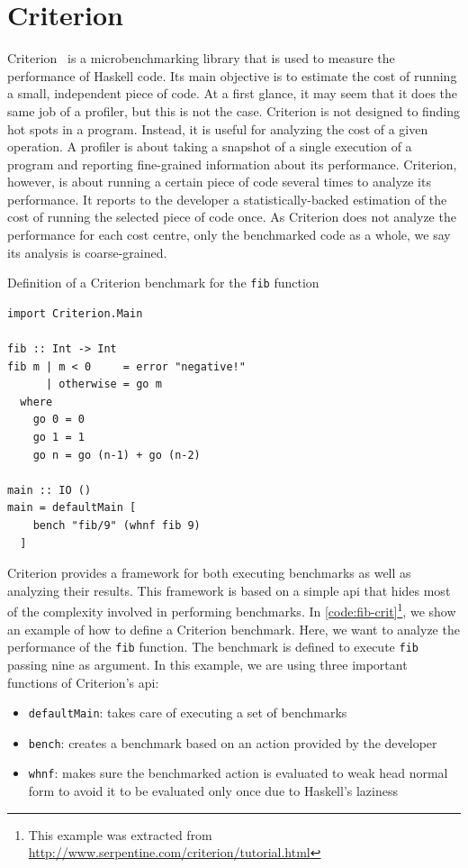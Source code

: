 \section{Criterion}\label{sec:criterion}
Criterion~\cite{sullivan:2009} is a microbenchmarking library that is used to measure the performance of Haskell code. Its main objective is to estimate the cost of running a small, independent piece of code. At a first glance, it may seem that it does the same job of a profiler, but this is not the case. Criterion is not designed to finding hot spots in a program. Instead, it is useful for analyzing the cost of a given operation. A profiler is about taking a snapshot of a single execution of a program and reporting fine-grained information about its performance. Criterion, however, is about running a certain piece of code several times to analyze its performance. It reports to the developer a statistically-backed estimation of the cost of running the selected piece of code once. As Criterion does not analyze the performance for each cost centre, only the benchmarked code as a whole, we say its analysis is coarse-grained.

\begin{listing}
  \caption{Definition of a Criterion benchmark for the \texttt{fib} function}
  \begin{verbatim}
import Criterion.Main

fib :: Int -> Int
fib m | m < 0     = error "negative!"
      | otherwise = go m
  where
    go 0 = 0
    go 1 = 1
    go n = go (n-1) + go (n-2)

main :: IO ()
main = defaultMain [
    bench "fib/9" (whnf fib 9)
  ]
  \end{verbatim}
  \label{code:fib-crit}
\end{listing}

Criterion provides a framework for both executing benchmarks as well as analyzing their results. This framework is based on a simple \ac{api} that hides most of the complexity involved in performing benchmarks. In \autoref{code:fib-crit}\footnote{This example was extracted from \url{http://www.serpentine.com/criterion/tutorial.html}}, we show an example of how to define a Criterion benchmark. Here, we want to analyze the performance of the \texttt{fib} function. The benchmark is defined to execute \texttt{fib} passing nine as argument. In this example, we are using three important functions of Criterion's \ac{api}:
\begin{itemize}
  \item \texttt{defaultMain}: takes care of executing a set of benchmarks
  \item \texttt{bench}: creates a benchmark based on an action provided by the developer
  \item \texttt{whnf}: makes sure the benchmarked action is evaluated to weak head normal form to avoid it to be evaluated only once due to Haskell's laziness
\end{itemize}

